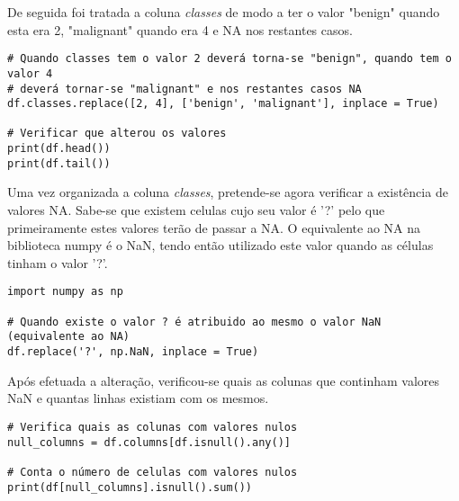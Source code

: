 \documentclass{article}
\begin{document}
De seguida foi tratada a coluna \textit{classes} de modo a ter o valor "benign" quando esta era 2, "malignant" quando era 4 e NA nos restantes casos.

\begin{lstlisting}
# Quando classes tem o valor 2 deverá torna-se "benign", quando tem o valor 4 
# deverá tornar-se "malignant" e nos restantes casos NA
df.classes.replace([2, 4], ['benign', 'malignant'], inplace = True)

# Verificar que alterou os valores
print(df.head())
print(df.tail())
\end{lstlisting}

Uma vez organizada a coluna \textit{classes}, pretende-se agora verificar a exist\^encia de valores NA. Sabe-se que existem celulas cujo seu valor \'e '?' pelo que primeiramente estes valores ter\~ao de passar a NA. O equivalente ao NA na biblioteca numpy \'e o NaN, tendo ent\~ao utilizado este valor quando as c\'elulas tinham o valor '?'.

\begin{lstlisting}
import numpy as np

# Quando existe o valor ? é atribuido ao mesmo o valor NaN (equivalente ao NA)
df.replace('?', np.NaN, inplace = True)
\end{lstlisting}

Ap\'os efetuada a altera\c c\~ao, verificou-se quais as colunas que continham valores NaN e quantas linhas existiam com os mesmos.

\begin{lstlisting}
# Verifica quais as colunas com valores nulos
null_columns = df.columns[df.isnull().any()]

# Conta o número de celulas com valores nulos
print(df[null_columns].isnull().sum())
\end{lstlisting}
\end{document}
